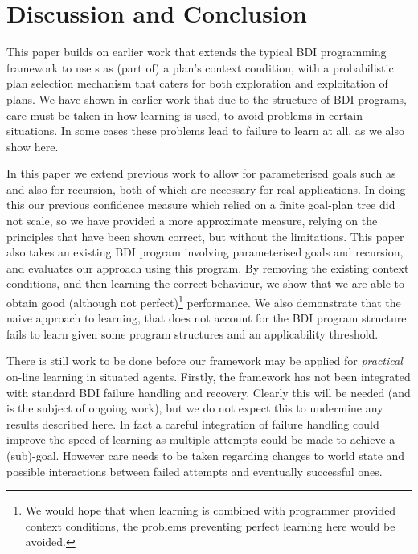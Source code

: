 \section{Discussion and Conclusion}\label{sec:discussion}

This paper builds on earlier work that extends
the typical BDI programming framework to use \dt{}s as (part of) a
plan's context condition, with a probabilistic plan selection
mechanism that caters for both exploration and exploitation of plans.
We have shown in earlier work that due to the structure of BDI
programs, care must be taken in how learning is used, to avoid
problems in certain situations. In some cases these problems lead to
failure to learn at all, as we also show here.

In this paper we extend previous work to allow for parameterised
goals such as  and also for recursion, both
of which are necessary for real applications. In doing this our
previous confidence measure which relied on a finite goal-plan tree
did not scale, so we have provided a more approximate measure, relying
on the principles that have been shown correct, but without the
limitations. This paper also takes an existing BDI program involving
parameterised goals and recursion, and evaluates our approach using
this program. By removing the existing context conditions, and then
learning the correct behaviour, we show that we are able to obtain
good (although not perfect)\footnote{We would hope that when learning
is combined with programmer provided context conditions, the problems
preventing perfect learning here would be avoided.} performance. We
also demonstrate that the naive approach to learning, that does not
account for the BDI program structure fails to learn given
some program structures and an applicability threshold.

There is still work to be done before our framework may be applied for {\it practical} on-line learning in situated agents. Firstly, the framework has not been integrated with standard BDI failure handling and recovery. Clearly
this will be needed (and is the subject of ongoing work), but we do not expect this to undermine any results described here. In fact a careful integration of
failure handling could improve the speed of learning as multiple
attempts could be made to achieve a (sub)-goal. However care needs
to be taken regarding changes to world state and possible interactions
between failed attempts and eventually successful ones.

